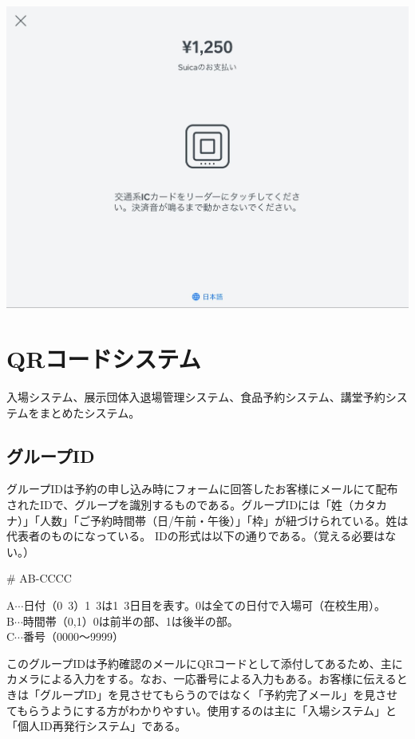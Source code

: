 \documentclass[dvipdfmx,jb5]{jarticle}
\begin{document}
\begin{enumerate}
\begin{enumerate}
\begin{enumerate}
     \includegraphics[scale=0.2]{assets/square_e-payment_scan.jpg}
    \end{enumerate}
   \end{enumerate}
  \end{enumerate}

\newpage
\section{QRコードシステム}
入場システム、展示団体入退場管理システム、食品予約システム、講堂予約システムをまとめたシステム。
\subsection{グループID}
グループIDは予約の申し込み時にフォームに回答したお客様にメールにて配布されたIDで、グループを識別するものである。グループIDには「姓（カタカナ）」「人数」「ご予約時間帯（日/午前・午後）」「枠」が紐づけられている。姓は代表者のものになっている。
IDの形式は以下の通りである。（覚える必要はない。）
\begin{screen}
 \begin{center}
 {\huge \# AB-CCCC}\\
 \end{center}
A$\cdots$日付（0~3）1~3は1~3日目を表す。0は全ての日付で入場可（在校生用）。\\
B$\cdots$時間帯（0,1）0は前半の部、1は後半の部。\\
C$\cdots$番号（0000〜9999）
\end{screen}
 このグループIDは予約確認のメールにQRコードとして添付してあるため、主にカメラによる入力をする。なお、一応番号による入力もある。お客様に伝えるときは「グループID」を見させてもらうのではなく「予約完了メール」を見させてもらうようにする方がわかりやすい。使用するのは主に「入場システム」と「個人ID再発行システム」である。
\end{document}
